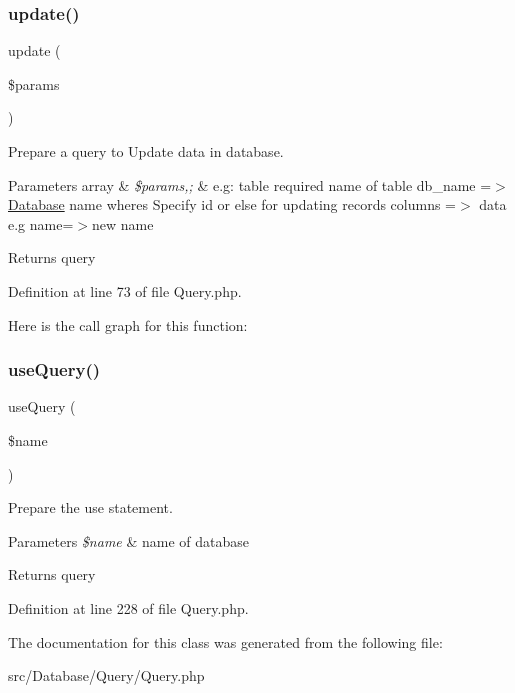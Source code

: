 \subsubsection{\texorpdfstring{update()}{update()}}
{\footnotesize\ttfamily update (\begin{DoxyParamCaption}\item[{}]{\$params }\end{DoxyParamCaption})}

Prepare a query to Update data in database.


\begin{DoxyParams}[1]{Parameters}
array & {\em \$params,;} & e.\+g\+: \textquotesingle{}table\textquotesingle{} required name of table \textquotesingle{}db\+\_\+name\textquotesingle{} =$>$ \mbox{\hyperlink{namespace_zest_1_1_database}{Database}} name \textquotesingle{}wheres\textquotesingle{} Specify id or else for updating records \textquotesingle{}columns\textquotesingle{} =$>$ data e.\+g name=$>$new name\\
\hline
\end{DoxyParams}
\begin{DoxyReturn}{Returns}
query 
\end{DoxyReturn}


Definition at line 73 of file Query.\+php.

Here is the call graph for this function\+:
\mbox{\label{class_zest_1_1_database_1_1_query_1_1_query_ae44347ec6a2b1e9a12e081db309d0734}} 
\subsubsection{\texorpdfstring{use\+Query()}{useQuery()}}
{\footnotesize\ttfamily use\+Query (\begin{DoxyParamCaption}\item[{}]{\$name }\end{DoxyParamCaption})}

Prepare the use statement.


\begin{DoxyParams}{Parameters}
{\em \$name} & name of database\\
\hline
\end{DoxyParams}
\begin{DoxyReturn}{Returns}
query 
\end{DoxyReturn}


Definition at line 228 of file Query.\+php.



The documentation for this class was generated from the following file\+:\begin{DoxyCompactItemize}
\item 
src/\+Database/\+Query/Query.\+php\end{DoxyCompactItemize}
